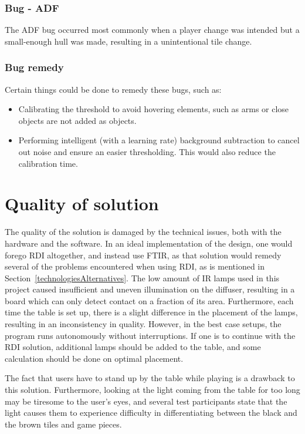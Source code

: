 \subsubsection*{Bug - ADF} 
The ADF bug occurred most commonly when a player change was intended but a small-enough hull was made, resulting in a unintentional tile change.
\subsubsection*{Bug remedy}
Certain things could be done to remedy these bugs, such as:
\begin{itemize}
	\item Calibrating the threshold to avoid hovering elements, such as arms or close objects are not added as objects.
	\item Performing intelligent (with a learning rate) background subtraction to cancel out noise and ensure an easier thresholding. This would also reduce the calibration time.
\end{itemize}

\section{Quality of solution}
The quality of the solution is damaged by the technical issues, both with the hardware and the software. In an ideal implementation of the design, one would forego RDI altogether, and instead use FTIR, as that solution would remedy several of the problems encountered when using RDI, as is mentioned in Section~\ref{technologiesAlternatives}. The low amount of IR lamps used in this project caused insufficient and uneven illumination on the diffuser, resulting in a board which can only detect contact on a fraction of its area. Furthermore, each time the table is set up, there is a slight difference in the placement of the lamps, resulting in an inconsistency in quality. However, in the best case setups, the program runs autonomously without interruptions. If one is to continue with the RDI solution, additional lamps should be added to the table, and some calculation should be done on optimal placement. 

The fact that users have to stand up by the table while playing is a drawback to this solution. Furthermore, looking at the light coming from the table for too long may be tiresome to the user’s eyes, and several test participants state that the light causes them to experience difficulty in differentiating between the black and the brown tiles and game pieces.


